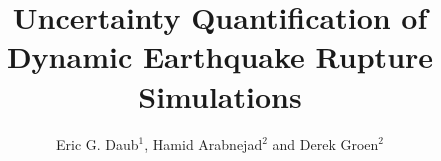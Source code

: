 \documentclass[openacc]{rstransa}%
\begin{document}
\title{Uncertainty Quantification of Dynamic Earthquake Rupture Simulations}

\author{%
Eric G. Daub$^{1}$, Hamid Arabnejad$^{2}$ and Derek Groen$^{2}$}

\address{$^{1}$Alan Turing Institute, London\\
$^{2}$Brunel University London}

\subject{Uncertainty Quantification, Surrogate Modeling, Earthquake Mechanics}


\end{document}
